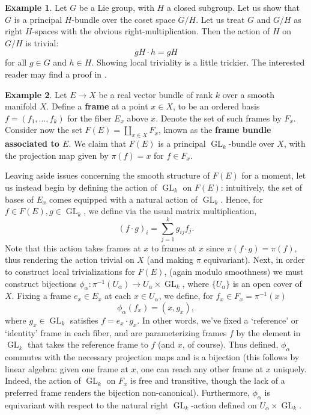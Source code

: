 \documentclass{book}
\DeclareMathOperator{\GL}{GL}
\theoremstyle{plain}
\theoremstyle{definition}
\newtheorem{exmp}{Example}
\theoremstyle{remark}
\begin{document}
\begin{exmp}
    Let $G$ be a Lie group, with $H$ a closed subgroup. Let us show that $G$ is a principal $H$-bundle over the coset space $G/H$.
    Let us treat $G$ and $G/H$ as right $H$-spaces with the obvious right-multiplication. Then the action of $H$ on $G/H$ is trivial:
    \[gH\cdot h = gH\]
    for all $g\in G$ and $h\in H$. Showing local triviality is a little trickier. The interested reader may find a proof in .
\end{exmp}

\begin{exmp}
    Let $E\to X$ be a real vector bundle of rank $k$ over a smooth manifold $X$.
    Define a \textbf{frame} at a point $x\in X$, to be an ordered basis $f=(f_1,\ldots, f_k)$ for the fiber $E_x$ above $x$. Denote the set of such frames by $F_x$.
    Consider now the set $F(E)=\coprod_{x\in X} F_x$, known as the \textbf{frame bundle associated to $E$}. We claim that $F(E)$ is a principal
    $\GL_k$-bundle over $X$, with the projection map given by $\pi(f)=x$ for $f\in F_x$.

    Leaving aside issues concerning the smooth structure of $F(E)$ for a moment, let us instead begin by defining the action of $\GL_k$ on $F(E)$:
    intuitively, the set of bases of $E_x$ comes equipped with a natural action of $\GL_k$.
    Hence, for $f\in F(E), g\in\GL_k$, we define via the usual matrix multiplication,
    \[(f\cdot g)_i=\sum_{j=1}^kg_{ij}f_j.\]
    Note that this action takes
    frames at $x$ to frames at $x$ since $\pi(f\cdot g)=\pi(f)$, thus rendering the action trivial on $X$ (and making $\pi$ equivariant). Next, in order to construct
    local trivializations for $F(E)$, (again modulo smoothness) we must construct bijections $\phi_\alpha:\pi^{-1}(U_\alpha)\to U_\alpha\times\GL_k$,
    where $\{U_\alpha\}$ is an open cover of $X$. Fixing a frame $e_x\in E_x$ at each $x\in U_\alpha$, we define, for $f_x\in F_x=\pi^{-1}(x)$
    \[\phi_\alpha(f_x)=(x, g_x),\]
    where $g_x\in\GL_k$ satisfies $f=e_x\cdot g_x$. In other words, we've fixed a `reference' or `identity' frame in each fiber, and are parameterizing
    frames $f$ by the element in $\GL_k$ that takes the reference frame to $f$ (and $x$, of course). Thus defined, $\phi_\alpha$ commutes with the
    necessary projection maps and is a bijection (this follows by linear algebra: given one frame at $x$, one can reach any other frame at $x$ uniquely. Indeed,
    the action of $\GL_k$ on $F_x$ is free and transitive, though the lack of a preferred frame renders the bijection non-canonical).
    Furthermore, $\phi_\alpha$ is equivariant with respect to the natural right $\GL_k$-action defined on $U_\alpha\times\GL_k$.


\end{exmp}
\end{document}
